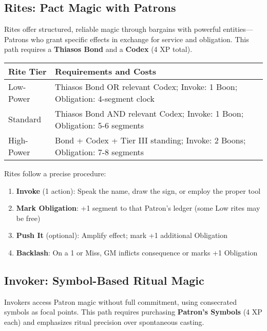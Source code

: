 \subsection*{Rites: Pact Magic with Patrons}

Rites offer structured, reliable magic through bargains with powerful entities—Patrons who grant specific effects in exchange for service and obligation. This path requires a \textbf{Thiasos Bond} and a \textbf{Codex} (4 XP total).

\begin{fatebox}
\begin{tabularx}{\textwidth}{lX}
\toprule
\textbf{Rite Tier} & \textbf{Requirements and Costs} \\
\midrule
Low-Power & Thiasos Bond OR relevant Codex; Invoke: 1 Boon; Obligation: 4-segment clock \\
Standard & Thiasos Bond AND relevant Codex; Invoke: 1 Boon; Obligation: 5-6 segments \\
High-Power & Bond + Codex + Tier III standing; Invoke: 2 Boons; Obligation: 7-8 segments \\
\bottomrule
\end{tabularx}
\end{fatebox}

Rites follow a precise procedure:
\begin{enumerate}
    \item \textbf{Invoke} (1 action): Speak the name, draw the sign, or employ the proper tool
    \item \textbf{Mark Obligation}: +1 segment to that Patron's ledger (some Low rites may be free)
    \item \textbf{Push It} (optional): Amplify effect; mark +1 additional Obligation
    \item \textbf{Backlash}: On a 1 or Miss, GM inflicts consequence or marks +1 Obligation
\end{enumerate}

\subsection*{Invoker: Symbol-Based Ritual Magic}

Invokers access Patron magic without full commitment, using consecrated symbols as focal points. This path requires purchasing \textbf{Patron's Symbols} (4 XP each) and emphasizes ritual precision over spontaneous casting.

